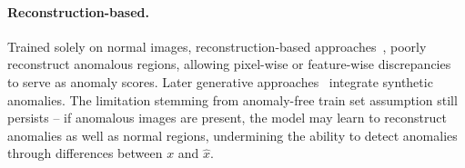 

\paragraph{Reconstruction-based.} 
Trained solely on normal images, reconstruction-based approaches~\cite{autoencoder, vae, fanogan}, poorly reconstruct anomalous regions, allowing pixel-wise or feature-wise discrepancies to serve as anomaly scores. Later generative approaches~\cite{draem, diffusionad, pouta} integrate synthetic anomalies. The limitation stemming from anomaly-free train set assumption still persists -- if anomalous images are present, the model may learn to reconstruct anomalies as well as normal regions, undermining the ability to detect anomalies through differences between $x$ and $\hat{x}$.

